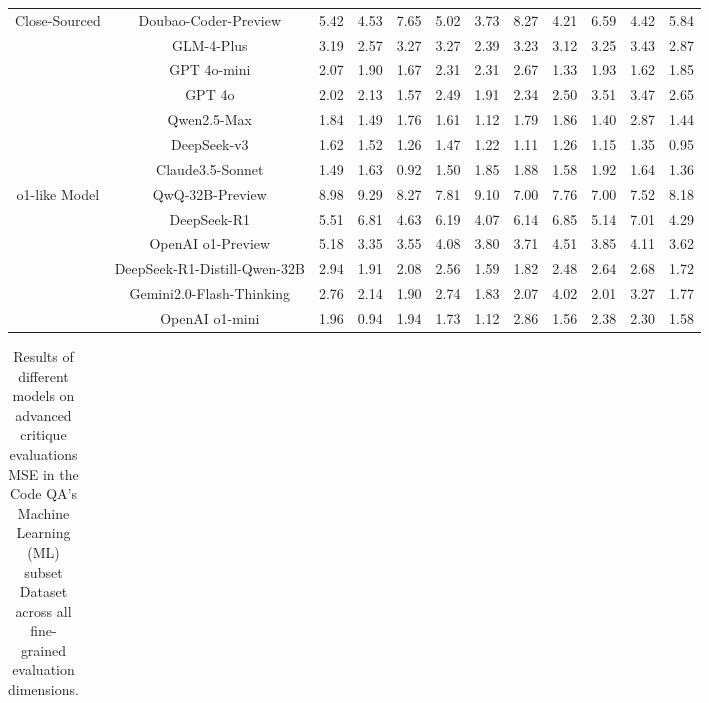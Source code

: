 \documentclass[11pt, a4paper, logo, copyright, nonumbering, amsart]{map}
\begin{document}
\begin{CJK*}{UTF8}{gbsn}
\begin{table*}[h!]
\begin{adjustbox}{width=\textwidth}
\begin{tabular}{c|c|cccccccccc}
    \midrule
    \multirow{7}{*}{Close-Sourced} 
    & Doubao-Coder-Preview & 5.42 & 4.53 & 7.65 & 5.02 & 3.73 & 8.27 & 4.21 & 6.59 & 4.42 & 5.84 \\
    & GLM-4-Plus & 3.19 & 2.57 & 3.27 & 3.27 & 2.39 & 3.23 & 3.12 & 3.25 & 3.43 & 2.87 \\
    & GPT 4o-mini & 2.07 & 1.90 & 1.67 & 2.31 & 2.31 & 2.67 & 1.33 & 1.93 & 1.62 & 1.85 \\
    & GPT 4o & 2.02 & 2.13 & 1.57 & 2.49 & 1.91 & 2.34 & 2.50 & 3.51 & 3.47 & 2.65 \\
    & Qwen2.5-Max & 1.84 & 1.49 & 1.76 & 1.61 & 1.12 & 1.79 & 1.86 & 1.40 & 2.87 & 1.44 \\
    & DeepSeek-v3 & 1.62 & 1.52 & 1.26 & 1.47 & 1.22 & 1.11 & 1.26 & 1.15 & 1.35 & 0.95 \\
    & Claude3.5-Sonnet & 1.49 & 1.63 & 0.92 & 1.50 & 1.85 & 1.88 & 1.58 & 1.92 & 1.64 & 1.36 \\
        
    \midrule
    \multirow{6}{*}{o1-like Model} 
    & QwQ-32B-Preview & 8.98 & 9.29 & 8.27 & 7.81 & 9.10 & 7.00 & 7.76 & 7.00 & 7.52 & 8.18 \\
    & DeepSeek-R1 & 5.51 & 6.81 & 4.63 & 6.19 & 4.07 & 6.14 & 6.85 & 5.14 & 7.01 & 4.29 \\
    & OpenAI o1-Preview & 5.18 & 3.35 & 3.55 & 4.08 & 3.80 & 3.71 & 4.51 & 3.85 & 4.11 & 3.62 \\
    & DeepSeek-R1-Distill-Qwen-32B & 2.94 & 1.91 & 2.08 & 2.56 & 1.59 & 1.82 & 2.48 & 2.64 & 2.68 & 1.72 \\
    & Gemini2.0-Flash-Thinking & 2.76 & 2.14 & 1.90 & 2.74 & 1.83 & 2.07 & 4.02 & 2.01 & 3.27 & 1.77 \\
    & OpenAI o1-mini & 1.96 & 0.94 & 1.94 & 1.73 & 1.12 & 2.86 & 1.56 & 2.38 & 2.30 & 1.58 \\
    \bottomrule
    \end{tabular}
    \end{adjustbox}
\end{table*}

\begin{table*}[h!]
    \centering
    \caption{Results of different models on advanced critique evaluations MSE in the Code QA's Machine Learning (ML) subset Dataset across all fine-grained evaluation dimensions.} \label{table:real_level2_ml_dim}
    \begin{adjustbox}{width=\textwidth}
    \begin{tabular}{c|c|cccccccccc}
    

\end{tabular}
\end{adjustbox}
\end{table*}
\end{CJK*}
\end{document}
